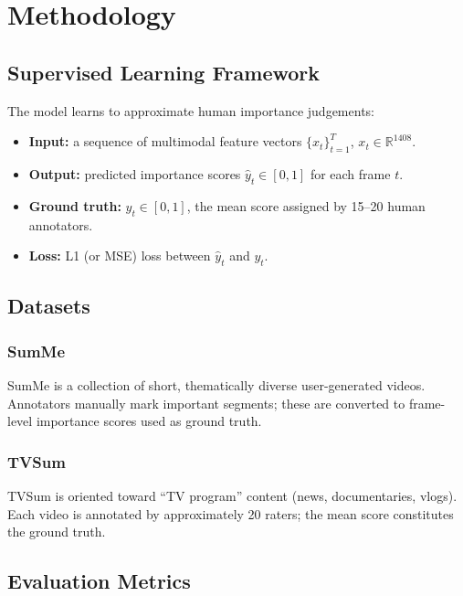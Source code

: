 \documentclass[12pt, a4paper]{report}
\begin{document}
\chapter{Methodology}

\section{Supervised Learning Framework}

The model learns to approximate human importance judgements:
\begin{itemize}
  \item \textbf{Input:} a sequence of multimodal feature vectors
        $\{x_t\}_{t=1}^{T}$, $x_t \in \mathbb{R}^{1408}$.
  \item \textbf{Output:} predicted importance scores $\hat{y}_t \in [0,1]$ for each
        frame $t$.
  \item \textbf{Ground truth:} $y_t \in [0,1]$, the mean score assigned by 15--20
        human annotators.
  \item \textbf{Loss:} L1 (or MSE) loss between $\hat{y}_t$ and $y_t$.
\end{itemize}

\section{Datasets}

\subsection{SumMe \cite{gygli2014}}
SumMe is a collection of short, thematically diverse user-generated videos.
Annotators manually mark important segments; these are converted to frame-level
importance scores used as ground truth.

\subsection{TVSum \cite{song2015}}
TVSum is oriented toward ``TV program'' content (news, documentaries, vlogs). Each
video is annotated by approximately 20 raters; the mean score constitutes the ground
truth.

\section{Evaluation Metrics}
\end{document}
